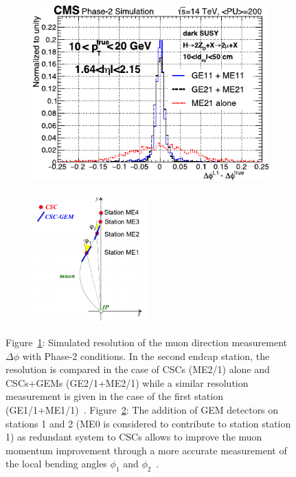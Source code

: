 	\begin{figure}[H]
		\begin{subfigure}{0.5\linewidth}
			\centering
			\includegraphics[width=.9\linewidth]{fig/chapt3/GEM-muon-direction.pdf}
			\caption{\label{fig:GEM-Muon:A}}
		\end{subfigure}
		\begin{subfigure}{0.5\linewidth}
			\centering
			\includegraphics[height=5cm]{fig/chapt3/GEM-muon-bending.png}
			\caption{\label{fig:GEM-Muon:B}}
		\end{subfigure}
		\caption{\label{fig:GEM-Muon} Figure~\ref{fig:GEM-Muon:A}: Simulated resolution of the muon direction measurement $\Delta\phi$ with Phase-2 conditions. In the second endcap station, the resolution is compared in the case of CSCs (ME2/1) alone and CSCs+GEMs (GE2/1+ME2/1) while a similar resolution measurement is given in the case of the first station (GE1/1+ME1/1)~\cite{PHASEIITP}. Figure~\ref{fig:GEM-Muon:B}: The addition of GEM detectors on stations 1 and 2 (ME0 is considered to contribute to station station 1) as redundant system to CSCs allows to improve the muon momentum improvement through a more accurate measurement of the local bending angles $\phi_1$ and $\phi_2$~\cite{PHASEIITP}.}
	\end{figure}
	
